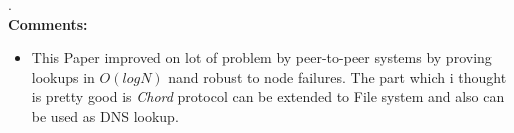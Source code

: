 \documentclass[a4paper,12pt, twoside]{article}
\begin{document}
.\\

\textbf{Comments:}
\begin{itemize}
	\item This Paper improved on lot of problem by peer-to-peer systems by proving lookups in $O(log N)$ nand robust to node failures. The part which i thought is pretty good is \emph{Chord} protocol can be extended to File system and also can be used as DNS lookup.  
\end{itemize}
\end{document}
